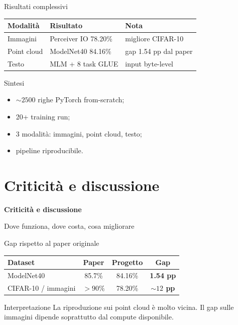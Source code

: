 \documentclass[aspectratio=169,10pt]{beamer}
\newcommand{\good}[1]{\textcolor{AccentGreen}{\textbf{#1}}}
\newcommand{\bad}[1]{\textcolor{AccentRed}{\textbf{#1}}}
\begin{document}
\begin{frame}{Risultati complessivi}
\small
\begin{center}
\begin{tabular}{lll}
\toprule
\textbf{Modalità} & \textbf{Risultato} & \textbf{Nota} \\
\midrule
Immagini & Perceiver IO 78.20\% & migliore CIFAR-10 \\
Point cloud & ModelNet40 84.16\% & gap 1.54 pp dal paper \\
Testo & MLM + 8 task GLUE & input byte-level \\
\bottomrule
\end{tabular}
\end{center}

\begin{exampleblock}{Sintesi}
\begin{itemize}
  \item $\sim2500$ righe PyTorch from-scratch;
  \item 20+ training run;
  \item 3 modalità: immagini, point cloud, testo;
  \item pipeline riproducibile.
\end{itemize}
\end{exampleblock}
\end{frame}

\section{Criticità e discussione}

\begin{frame}[plain]
\centering
\vfill
{\Huge\color{DeepBlue}\textbf{Criticità e discussione}}
\vspace{1em}

{\large Dove funziona, dove costa, cosa migliorare}
\vfill
\end{frame}

\begin{frame}{Gap rispetto al paper originale}
\small
\begin{center}
\begin{tabular}{lccc}
\toprule
\textbf{Dataset} & \textbf{Paper} & \textbf{Progetto} & \textbf{Gap} \\
\midrule
ModelNet40 & 85.7\% & 84.16\% & \good{1.54 pp} \\
CIFAR-10 / immagini & $>90\%$ & 78.20\% & \bad{$\sim12$ pp} \\
\bottomrule
\end{tabular}
\end{center}

\begin{block}{Interpretazione}
La riproduzione sui point cloud è molto vicina. Il gap sulle immagini dipende soprattutto dal compute disponibile.
\end{block}
\end{frame}
\end{document}
